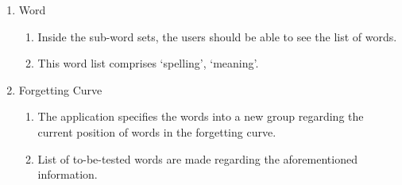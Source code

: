 \documentclass[conference]{IEEEtran}
\begin{document}
\begin{enumerate}
\begin{enumerate}
    \end{enumerate}
\item Word
    \begin{enumerate}
    \item Inside the sub-word sets, the users should be able to see the list of words.
    \item This word list comprises ‘spelling’, ‘meaning’. 
    \end{enumerate}
\item Forgetting Curve
    \begin{enumerate}
    \item The application specifies the words into a new group regarding the current position of words in the forgetting curve.
    \item List of to-be-tested words are made regarding the aforementioned information. 
    \end{enumerate}
\end{enumerate}
\end{document}
